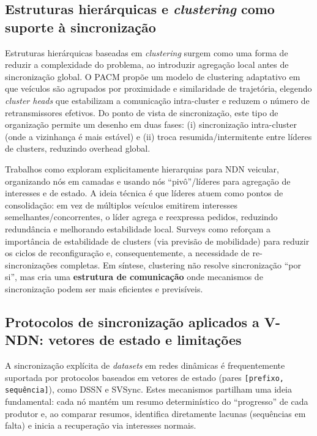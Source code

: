 \subsection{Estruturas hierárquicas e \textit{clustering} como suporte à sincronização}

Estruturas hierárquicas baseadas em \textit{clustering} surgem como uma forma de reduzir a complexidade do problema, ao introduzir agregação local antes de sincronização global. O \gls{PACM} \cite{sampath_position-based_2021} propõe um modelo de clustering adaptativo em que veículos são agrupados por proximidade e similaridade de trajetória, elegendo \textit{cluster heads} que estabilizam a comunicação intra-cluster e reduzem o número de retransmissores efetivos. Do ponto de vista de sincronização, este tipo de organização permite um desenho em duas fases: (i) sincronização intra-cluster (onde a vizinhança é mais estável) e (ii) troca resumida/intermitente entre líderes de clusters, reduzindo overhead global.

Trabalhos como \cite{de_castro_dynamic_2015} exploram explicitamente hierarquias para \gls{NDN} veicular, organizando nós em camadas e usando nós “pivô”/líderes para agregação de interesses e de estado. A ideia técnica é que líderes atuem como pontos de consolidação: em vez de múltiplos veículos emitirem interesses semelhantes/concorrentes, o líder agrega e reexpressa pedidos, reduzindo redundância e melhorando estabilidade local. Surveys como \cite{ayyub_comprehensive_2022} reforçam a importância de estabilidade de clusters (via previsão de mobilidade) para reduzir os ciclos de reconfiguração e, consequentemente, a necessidade de re-sincronizações completas. Em síntese, clustering não resolve sincronização “por si”, mas cria uma \textbf{estrutura de comunicação} onde mecanismos de sincronização podem ser mais eficientes e previsíveis.

\subsection{Protocolos de sincronização aplicados a \gls{V-NDN}: vetores de estado e limitações}

A sincronização explícita de \textit{datasets} em redes dinâmicas é frequentemente suportada por protocolos baseados em vetores de estado (pares \texttt{[prefixo, sequência]}), como \gls{DSSN} e \gls{SVSync}. Estes mecanismos partilham uma ideia fundamental: cada nó mantém um resumo determinístico do “progresso” de cada produtor e, ao comparar resumos, identifica diretamente lacunas (sequências em falta) e inicia a recuperação via interesses normais.


